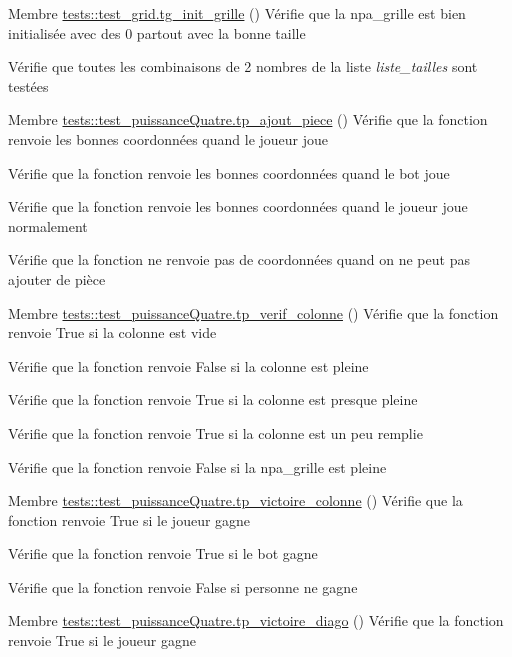 
\begin{DoxyRefList}
\item[Membre \mbox{\hyperlink{namespacetests_1_1test__grid_abd1e217c51c4ec2bb4d911605484016c}{tests\+::test\+\_\+grid.tg\+\_\+init\+\_\+grille}} ()]\label{test__test000001}%
%
Vérifie que la npa\+\_\+grille est bien initialisée avec des 0 partout avec la bonne taille 

Vérifie que toutes les combinaisons de 2 nombres de la liste {\itshape liste\+\_\+tailles} sont testées 
\item[Membre \mbox{\hyperlink{namespacetests_1_1test__puissanceQuatre_a50ee15df29277e36dd8c7b091e6e6839}{tests\+::test\+\_\+puissance\+Quatre.tp\+\_\+ajout\+\_\+piece}} ()]\label{test__test000003}%
%
Vérifie que la fonction renvoie les bonnes coordonnées quand le joueur joue 

Vérifie que la fonction renvoie les bonnes coordonnées quand le bot joue 

Vérifie que la fonction renvoie les bonnes coordonnées quand le joueur joue normalement 

Vérifie que la fonction ne renvoie pas de coordonnées quand on ne peut pas ajouter de pièce 
\item[Membre \mbox{\hyperlink{namespacetests_1_1test__puissanceQuatre_a3d1cea88a0c0ecf7a46333b4d98a0065}{tests\+::test\+\_\+puissance\+Quatre.tp\+\_\+verif\+\_\+colonne}} ()]\label{test__test000002}%
%
Vérifie que la fonction renvoie True si la colonne est vide 

Vérifie que la fonction renvoie False si la colonne est pleine 

Vérifie que la fonction renvoie True si la colonne est presque pleine 

Vérifie que la fonction renvoie True si la colonne est un peu remplie 

Vérifie que la fonction renvoie False si la npa\+\_\+grille est pleine 
\item[Membre \mbox{\hyperlink{namespacetests_1_1test__puissanceQuatre_a6b60c67d64944868f7f29f4ecd75dff0}{tests\+::test\+\_\+puissance\+Quatre.tp\+\_\+victoire\+\_\+colonne}} ()]\label{test__test000005}%
%
Vérifie que la fonction renvoie True si le joueur gagne 

Vérifie que la fonction renvoie True si le bot gagne 

Vérifie que la fonction renvoie False si personne ne gagne 
\item[Membre \mbox{\hyperlink{namespacetests_1_1test__puissanceQuatre_afca80042370ade9eff4620f6f8ffd306}{tests\+::test\+\_\+puissance\+Quatre.tp\+\_\+victoire\+\_\+diago}} ()]\label{test__test000006}%
%
Vérifie que la fonction renvoie True si le joueur gagne 


\end{DoxyRefList}
